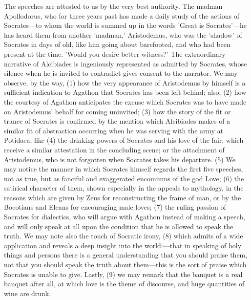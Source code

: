 \documentclass[11pt,letter]{article}
\begin{document}
\par  The speeches are attested to us by the very best authority. The madman Apollodorus, who for three years past has made a daily study of the actions of Socrates—to whom the world is summed up in the words 'Great is Socrates'—he has heard them from another 'madman,' Aristodemus, who was the 'shadow' of Socrates in days of old, like him going about barefooted, and who had been present at the time. 'Would you desire better witness?' The extraordinary narrative of Alcibiades is ingeniously represented as admitted by Socrates, whose silence when he is invited to contradict gives consent to the narrator. We may observe, by the way, (1) how the very appearance of Aristodemus by himself is a sufficient indication to Agathon that Socrates has been left behind; also, (2) how the courtesy of Agathon anticipates the excuse which Socrates was to have made on Aristodemus' behalf for coming uninvited; (3) how the story of the fit or trance of Socrates is confirmed by the mention which Alcibiades makes of a similar fit of abstraction occurring when he was serving with the army at Potidaea; like (4) the drinking powers of Socrates and his love of the fair, which receive a similar attestation in the concluding scene; or the attachment of Aristodemus, who is not forgotten when Socrates takes his departure. (5) We may notice the manner in which Socrates himself regards the first five speeches, not as true, but as fanciful and exaggerated encomiums of the god Love; (6) the satirical character of them, shown especially in the appeals to mythology, in the reasons which are given by Zeus for reconstructing the frame of man, or by the Boeotians and Eleans for encouraging male loves; (7) the ruling passion of Socrates for dialectics, who will argue with Agathon instead of making a speech, and will only speak at all upon the condition that he is allowed to speak the truth. We may note also the touch of Socratic irony, (8) which admits of a wide application and reveals a deep insight into the world:—that in speaking of holy things and persons there is a general understanding that you should praise them, not that you should speak the truth about them—this is the sort of praise which Socrates is unable to give. Lastly, (9) we may remark that the banquet is a real banquet after all, at which love is the theme of discourse, and huge quantities of wine are drunk.
\end{document}
